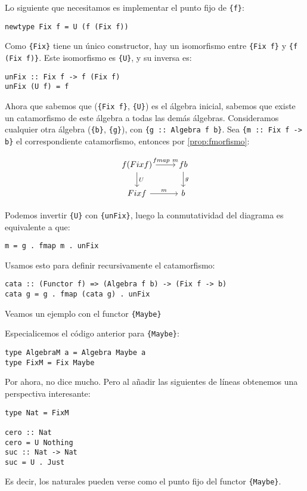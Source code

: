 \documentclass[12pt, twoside]{book}
\newcommand{\code}[1]{\Verb+{#1}+}
\begin{document}
Lo siguiente que necesitamos es implementar el punto fijo de \code{f}:
\begin{verbatim}
newtype Fix f = U (f (Fix f))
\end{verbatim}
Como \code{Fix} tiene un único constructor, hay un isomorfismo entre \code{Fix f} y \code{f (Fix f)}.
Este isomorfismo es \code{U}, y su inversa es:
\begin{verbatim}
unFix :: Fix f -> f (Fix f)
unFix (U f) = f
\end{verbatim}

Ahora que sabemos que (\code{Fix f}, \code{U}) es el álgebra inicial, sabemos que existe un catamorfismo de este álgebra a todas las demás álgebras.
Consideramos cualquier otra álgebra (\code{b}, \code{g}), con \code{g :: Algebra f b}. Sea \code{m :: Fix f -> b} el correspondiente catamorfismo, entonces por \ref{prop:fmorfismo}:

\[
\begin{tikzcd}
{f (Fix f)} \arrow[r,"fmap\ m"] \arrow[d,"U"] & f b \arrow[d,"g"]\\
{Fix f} \arrow[r,"m"] & b
\end{tikzcd}
\]

Podemos invertir \code{U} con \code{unFix}, luego la conmutatividad del diagrama es equivalente a que:
\begin{verbatim}
m = g . fmap m . unFix
\end{verbatim}
Usamos esto para definir recursivamente el catamorfismo:
\begin{verbatim}
cata :: (Functor f) => (Algebra f b) -> (Fix f -> b)
cata g = g . fmap (cata g) . unFix
\end{verbatim}

Veamos un ejemplo con el functor \code{Maybe}
\begin{example}
Especialicemos el código anterior para \code{Maybe}:
\begin{verbatim}
type AlgebraM a = Algebra Maybe a
type FixM = Fix Maybe
\end{verbatim}
Por ahora, no dice mucho. Pero al añadir las siguientes de líneas obtenemos una perspectiva interesante:
\begin{verbatim}
type Nat = FixM

cero :: Nat
cero = U Nothing
suc :: Nat -> Nat
suc = U . Just
\end{verbatim}
Es decir, los naturales pueden verse como el punto fijo del functor \code{Maybe}.
\end{example}
\end{document}
